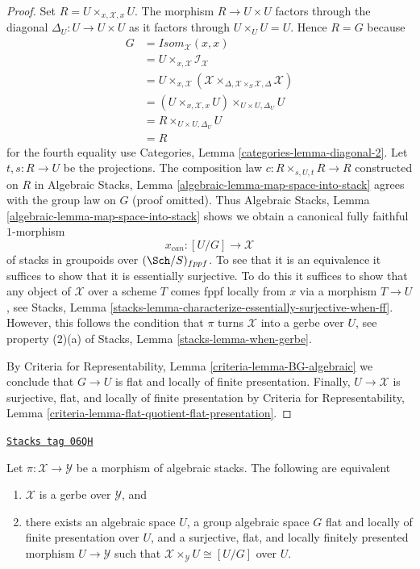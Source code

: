 \begin{proof}
Set $R = U \times_{x, \mathcal{X}, x} U$. The morphism $R \to U \times U$
factors through the diagonal $\Delta_U : U \to U \times U$ as it factors
through $U \times_U U = U$. Hence $R = G$ because
\begin{align*}
G & = \mathit{Isom}_\mathcal{X}(x, x) \\
& = U \times_{x, \mathcal{X}} \mathcal{I}_\mathcal{X} \\
& = U \times_{x, \mathcal{X}}
(\mathcal{X}
\times_{\Delta, \mathcal{X} \times_S \mathcal{X}, \Delta}
\mathcal{X}) \\
& = (U \times_{x, \mathcal{X}, x} U) \times_{U \times U, \Delta_U} U \\
& = R \times_{U \times U, \Delta_U} U \\
& = R
\end{align*}
for the fourth equality use
Categories, Lemma \ref{categories-lemma-diagonal-2}.
Let $t, s : R \to U$ be the projections.
The composition law $c : R \times_{s, U, t} R \to R$ constructed on $R$ in
Algebraic Stacks, Lemma \ref{algebraic-lemma-map-space-into-stack}
agrees with the group law on $G$ (proof omitted). Thus
Algebraic Stacks, Lemma \ref{algebraic-lemma-map-space-into-stack}
shows we obtain a canonical fully faithful $1$-morphism
$$
x_{can} : [U/G] \longrightarrow \mathcal{X}
$$
of stacks in groupoids over $(\Sch/S)_{fppf}$. To see that it is
an equivalence it suffices to show that it is essentially surjective.
To do this it suffices to show that any object of $\mathcal{X}$ over
a scheme $T$ comes fppf locally from $x$ via a morphism $T \to U$, see
Stacks, Lemma \ref{stacks-lemma-characterize-essentially-surjective-when-ff}.
However, this follows the condition that $\pi$ turns $\mathcal{X}$
into a gerbe over $U$, see property (2)(a) of
Stacks, Lemma \ref{stacks-lemma-when-gerbe}.

\medskip\noindent
By
Criteria for Representability, Lemma \ref{criteria-lemma-BG-algebraic}
we conclude that $G \to U$ is flat and locally of finite presentation.
Finally, $U \to \mathcal{X}$ is surjective, flat, and locally of finite
presentation by
Criteria for Representability, Lemma
\ref{criteria-lemma-flat-quotient-flat-presentation}.
\end{proof}

\begin{lemma}
\label{stacks-morphisms-lemma-local-structure-gerbe}
\href{https://stacks.math.columbia.edu/tag/06QH}{\texttt{Stacks tag 06QH}}

Let $\pi : \mathcal{X} \to \mathcal{Y}$ be a morphism of algebraic stacks.
The following are equivalent
\begin{enumerate}
\item $\mathcal{X}$ is a gerbe over $\mathcal{Y}$, and
\item there exists an algebraic space $U$, a group algebraic space $G$
flat and locally of finite presentation over $U$, and a
surjective, flat, and locally finitely presented
morphism $U \to \mathcal{Y}$ such that
$\mathcal{X} \times_\mathcal{Y} U \cong [U/G]$ over $U$.
\end{enumerate}
\end{lemma}

